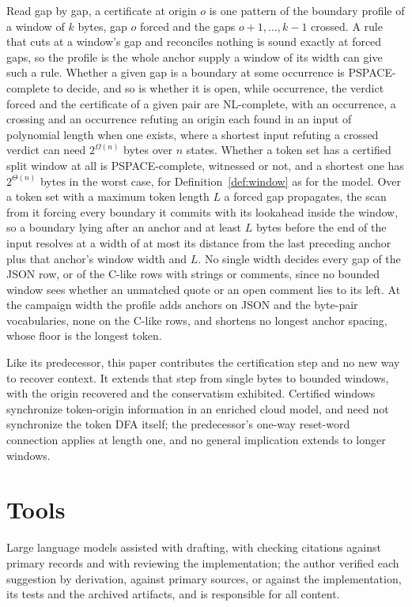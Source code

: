 \documentclass[11pt,a4paper]{article}
\theoremstyle{definition}
\theoremstyle{plain}
\begin{document}
Read gap by gap, a certificate at origin $o$ is one pattern of the boundary profile of a window of $k$ bytes, gap $o$
forced and the gaps $o + 1, \ldots, k - 1$ crossed. A rule that cuts at a window's gap and reconciles nothing is sound
exactly at forced gaps, so the profile is the whole anchor supply a window of its width can give such a rule. Whether a
given gap is a boundary at some occurrence is PSPACE-complete to decide, and so is whether it is open, while occurrence,
the verdict forced and the certificate of a given pair are NL-complete, with an occurrence, a crossing and an occurrence
refuting an origin each found in an input of polynomial length when one exists, where a shortest input refuting a
crossed verdict can need $2^{\Omega(n)}$ bytes over $n$ states. Whether a token set has a certified split window at all
is PSPACE-complete, witnessed or not, and a shortest one has $2^{\Theta(n)}$ bytes in the worst case, for
Definition~\ref{def:window} as for the model. Over a token set with a maximum token length $L$ a forced gap propagates,
the scan from it forcing every boundary it commits with its lookahead inside the window, so a boundary lying after an
anchor and at least $L$ bytes before the end of the input resolves at a width of at most its distance from the last
preceding anchor plus that anchor's window width and $L$. No single width decides every gap of the JSON row, or of the
C-like rows with strings or comments, since no bounded window sees whether an unmatched quote or an open comment lies to
its left. At the campaign width the profile adds anchors on JSON and the byte-pair vocabularies, none on the C-like
rows, and shortens no longest anchor spacing, whose floor is the longest token.

Like its predecessor, this paper contributes the certification step and no new way to recover context. It extends that
step from single bytes to bounded windows, with the origin recovered and the conservatism exhibited. Certified windows
synchronize token-origin information in an enriched cloud model, and need not synchronize the token DFA itself; the
predecessor's one-way reset-word connection applies at length one, and no general implication extends to longer windows.

\section*{Tools}

Large language models assisted with drafting, with checking citations against primary records and with reviewing the
implementation; the author verified each suggestion by derivation, against primary sources, or against the
implementation, its tests and the archived artifacts, and is responsible for all content.
\end{document}
